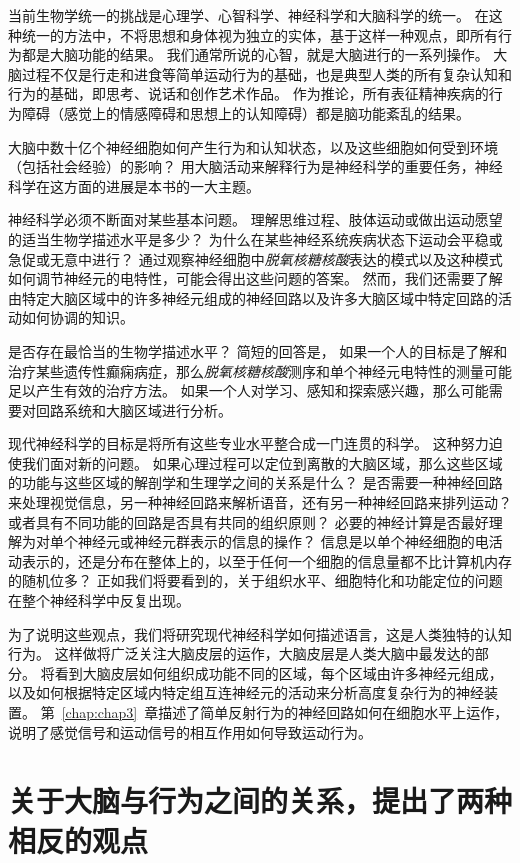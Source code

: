 当前生物学统一的挑战是心理学、心智科学、神经科学和大脑科学的统一。 
在这种统一的方法中，不将思想和身体视为独立的实体，基于这样一种观点，即所有行为都是大脑功能的结果。 
我们通常所说的心智，就是大脑进行的一系列操作。 
大脑过程不仅是行走和进食等简单运动行为的基础，也是典型人类的所有复杂认知和行为的基础，即思考、说话和创作艺术作品。 
作为推论，所有表征精神疾病的行为障碍（感觉上的情感障碍和思想上的认知障碍）都是脑功能紊乱的结果。


大脑中数十亿个神经细胞如何产生行为和认知状态，以及这些细胞如何受到环境（包括社会经验）的影响？ 
用大脑活动来解释行为是神经科学的重要任务，神经科学在这方面的进展是本书的一大主题。


神经科学必须不断面对某些基本问题。 
理解思维过程、肢体运动或做出运动愿望的适当生物学描述水平是多少？ 
为什么在某些神经系统疾病状态下运动会平稳或急促或无意中进行？ 
通过观察神经细胞中\textit{脱氧核糖核酸}表达的模式以及这种模式如何调节神经元的电特性，可能会得出这些问题的答案。 
然而，我们还需要了解由特定大脑区域中的许多神经元组成的神经回路以及许多大脑区域中特定回路的活动如何协调的知识。


是否存在最恰当的生物学描述水平？
简短的回答是，
如果一个人的目标是了解和治疗某些遗传性癫痫病症，那么\textit{脱氧核糖核酸}测序和单个神经元电特性的测量可能足以产生有效的治疗方法。
如果一个人对学习、感知和探索感兴趣，那么可能需要对回路系统和大脑区域进行分析。


现代神经科学的目标是将所有这些专业水平整合成一门连贯的科学。
这种努力迫使我们面对新的问题。
如果心理过程可以定位到离散的大脑区域，那么这些区域的功能与这些区域的解剖学和生理学之间的关系是什么？ 
是否需要一种神经回路来处理视觉信息，另一种神经回路来解析语音，还有另一种神经回路来排列运动？
或者具有不同功能的回路是否具有共同的组织原则？
必要的神经计算是否最好理解为对单个神经元或神经元群表示的信息的操作？
信息是以单个神经细胞的电活动表示的，还是分布在整体上的，以至于任何一个细胞的信息量都不比计算机内存的随机位多？
正如我们将要看到的，关于组织水平、细胞特化和功能定位的问题在整个神经科学中反复出现。


为了说明这些观点，我们将研究现代神经科学如何描述语言，这是人类独特的认知行为。
这样做将广泛关注大脑皮层的运作，大脑皮层是人类大脑中最发达的部分。
将看到大脑皮层如何组织成功能不同的区域，每个区域由许多神经元组成，以及如何根据特定区域内特定组互连神经元的活动来分析高度复杂行为的神经装置。
第~\ref{chap:chap3}~章描述了简单反射行为的神经回路如何在细胞水平上运作，说明了感觉信号和运动信号的相互作用如何导致运动行为。



\section{关于大脑与行为之间的关系，提出了两种相反的观点}

